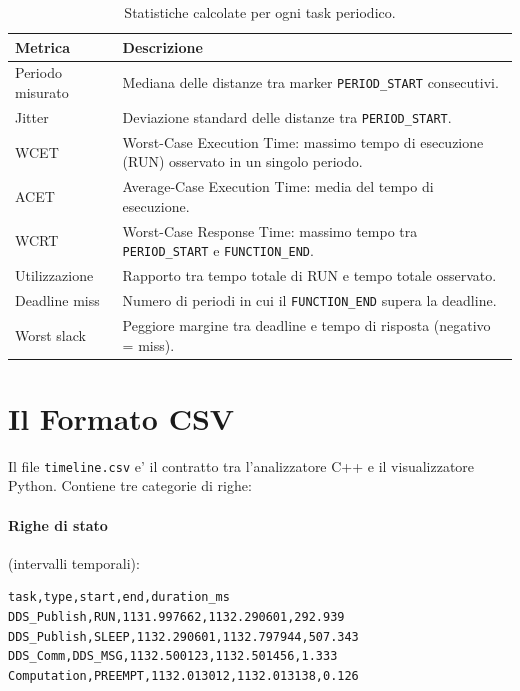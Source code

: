 \begin{table}[htbp]
\centering
\caption{Statistiche calcolate per ogni task periodico.}
\label{tab:stats}
\begin{tabular}{lp{8cm}}
\toprule
\textbf{Metrica} & \textbf{Descrizione} \\
\midrule
Periodo misurato & Mediana delle distanze tra marker \texttt{PERIOD\_START}
                   consecutivi. \\
Jitter & Deviazione standard delle distanze tra \texttt{PERIOD\_START}. \\
WCET & Worst-Case Execution Time: massimo tempo di esecuzione (RUN)
       osservato in un singolo periodo. \\
ACET & Average-Case Execution Time: media del tempo di esecuzione. \\
WCRT & Worst-Case Response Time: massimo tempo tra \texttt{PERIOD\_START}
       e \texttt{FUNCTION\_END}. \\
Utilizzazione & Rapporto tra tempo totale di RUN e tempo totale
                osservato. \\
Deadline miss & Numero di periodi in cui il \texttt{FUNCTION\_END}
               supera la deadline. \\
Worst slack & Peggiore margine tra deadline e tempo di risposta
              (negativo = miss). \\
\bottomrule
\end{tabular}
\end{table}


\section{Il Formato CSV}
\label{sec:csv}

Il file \texttt{timeline.csv} e' il contratto tra l'analizzatore C++ e
il visualizzatore Python. Contiene tre categorie di righe:

\paragraph{Righe di stato} (intervalli temporali):
\begin{verbatim}
task,type,start,end,duration_ms
DDS_Publish,RUN,1131.997662,1132.290601,292.939
DDS_Publish,SLEEP,1132.290601,1132.797944,507.343
DDS_Comm,DDS_MSG,1132.500123,1132.501456,1.333
Computation,PREEMPT,1132.013012,1132.013138,0.126
\end{verbatim}

